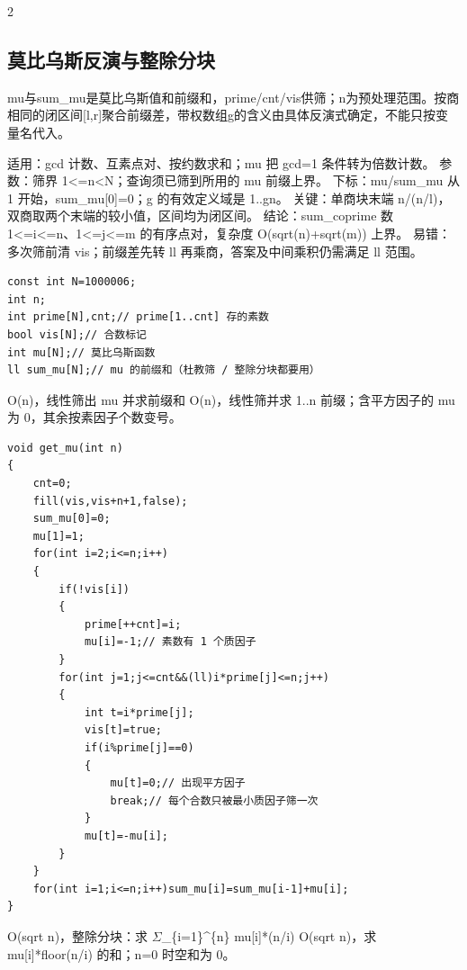 \documentclass[UTF8,fontset=fandol,a4paper,twoside]{ctexart}
\newcommand{\note}[1]{{\fontsize{10}{12}\selectfont #1\par}}
\begin{document}
\begin{multicols}{2}
\subsection{莫比乌斯反演与整除分块}

\note{mu与sum\_mu是莫比乌斯值和前缀和，prime/\allowbreak{}cnt/\allowbreak{}vis供筛；n为预处理范围。按商相同的闭区间[\allowbreak{}l,\allowbreak{}r]\allowbreak{}聚合前缀差，带权数组g的含义由具体反演式确定，不能只按变量名代入。}
\note{适用：gcd 计数、互素点对、按约数求和；mu 把 gcd=\allowbreak{}1 条件转为倍数计数。 参数：筛界 1<\allowbreak{}=\allowbreak{}n<\allowbreak{}N；查询须已筛到所用的 mu 前缀上界。 下标：mu/\allowbreak{}sum\_mu 从 1 开始，sum\_mu[\allowbreak{}0]\allowbreak{}=\allowbreak{}0；g 的有效定义域是 1.\allowbreak{}.\allowbreak{}gn。 关键：单商块末端 n/\allowbreak{}(\allowbreak{}n/\allowbreak{}l)\allowbreak{}，双商取两个末端的较小值，区间均为闭区间。 结论：sum\_coprime 数 1<\allowbreak{}=\allowbreak{}i<\allowbreak{}=\allowbreak{}n、1<\allowbreak{}=\allowbreak{}j<\allowbreak{}=\allowbreak{}m 的有序点对，复杂度 O(\allowbreak{}sqrt(\allowbreak{}n)\allowbreak{}+\allowbreak{}sqrt(\allowbreak{}m)\allowbreak{})\allowbreak{} 上界。 易错：多次筛前清 vis；前缀差先转 ll 再乘商，答案及中间乘积仍需满足 ll 范围。}
\begin{lstlisting}
const int N=1000006;
int n;
int prime[N],cnt;// prime[1..cnt] 存的素数
bool vis[N];// 合数标记
int mu[N];// 莫比乌斯函数
ll sum_mu[N];// mu 的前缀和（杜教筛 / 整除分块都要用）
\end{lstlisting}
\note{O(\allowbreak{}n)\allowbreak{}，线性筛出 mu 并求前缀和 O(\allowbreak{}n)\allowbreak{}，线性筛并求 1.\allowbreak{}.\allowbreak{}n 前缀；含平方因子的 mu 为 0，其余按素因子个数变号。}
\begin{lstlisting}
void get_mu(int n)
{
    cnt=0;
    fill(vis,vis+n+1,false);
    sum_mu[0]=0;
    mu[1]=1;
    for(int i=2;i<=n;i++)
    {
        if(!vis[i])
        {
            prime[++cnt]=i;
            mu[i]=-1;// 素数有 1 个质因子
        }
        for(int j=1;j<=cnt&&(ll)i*prime[j]<=n;j++)
        {
            int t=i*prime[j];
            vis[t]=true;
            if(i%prime[j]==0)
            {
                mu[t]=0;// 出现平方因子
                break;// 每个合数只被最小质因子筛一次
            }
            mu[t]=-mu[i];
        }
    }
    for(int i=1;i<=n;i++)sum_mu[i]=sum_mu[i-1]+mu[i];
}
\end{lstlisting}
\note{O(\allowbreak{}sqrt n)\allowbreak{}，整除分块：求 \ensuremath{\Sigma}\_\{i=\allowbreak{}1\}\textasciicircum{}\{n\} mu[\allowbreak{}i]\allowbreak{}*(\allowbreak{}n/\allowbreak{}i)\allowbreak{} O(\allowbreak{}sqrt n)\allowbreak{}，求 mu[\allowbreak{}i]\allowbreak{}*floor(\allowbreak{}n/\allowbreak{}i)\allowbreak{} 的和；n=\allowbreak{}0 时空和为 0。}

\end{multicols}
\end{document}
